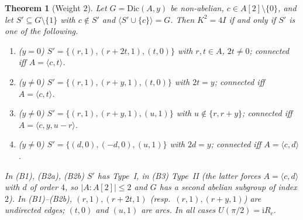 \documentclass[preprint,11pt]{elsarticle}
\newtheorem{theorem}{Theorem}[section]
\theoremstyle{definition}
\theoremstyle{remark}
\newcommand{\ii}{\mathrm i}
\begin{document}
\begin{theorem}[Weight $2$]\label{gd:k2}
Let $G=\mathrm{Dic}(A,y)$ be non-abelian, $c\in A[2]\setminus\{0\}$, and let $S'\subseteq G\setminus\{1\}$ with $c\notin S'$ and $\langle S'\cup\{c\}\rangle=G$. Then $K^2=4I$ if and only if $S'$ is one of the following.
\begin{enumerate}
\item[(B1)] ($y=0$) $S'=\{(r,1),(r+2t,1),(t,0)\}$ with $r,t\in A$, $2t\ne0$; connected iff $A=\langle c,t\rangle$.
\item[(B2a)] ($y\ne0$) $S'=\{(r,1),(r+y,1),(t,0)\}$ with $2t=y$; connected iff $A=\langle c,t\rangle$.
\item[(B2b)] ($y\ne0$) $S'=\{(r,1),(r+y,1),(u,1)\}$ with $u\notin\{r,r+y\}$; connected iff $A=\langle c,y,u-r\rangle$.
\item[(B3)] ($y\ne0$) $S'=\{(d,0),(-d,0),(u,1)\}$ with $2d=y$; connected iff $A=\langle c,d\rangle$.
\end{enumerate}
In (B1), (B2a), (B2b) $S'$ has Type~I, in (B3) Type~II (the latter forces $A=\langle c,d\rangle$ with $d$ of order $4$, so $|A:A[2]|\le2$ and $G$ has a second abelian subgroup of index $2$). In (B1)--(B2b), $(r,1),(r+2t,1)$ (resp.\ $(r,1),(r+y,1)$) are undirected edges; $(t,0)$ and $(u,1)$ are arcs. In all cases $U(\pi/2)=\ii R_c$.
\end{theorem}
\end{document}
